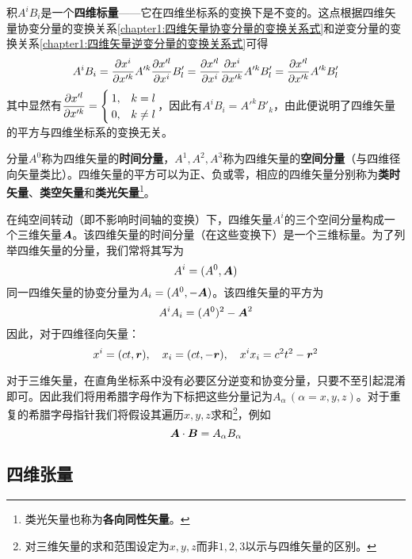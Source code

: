 积$A^iB_i$是一个{\bf 四维标量}——它在四维坐标系的变换下是不变的。这点根据四维矢量协变分量的变换关系\eqref{chapter1:四维矢量协变分量的变换关系式}和逆变分量的变换关系\eqref{chapter1:四维矢量逆变分量的变换关系式}可得
\begin{equation*}
	A^iB_i = \frac{\partial x^i}{\partial x'^k} A'^k \frac{\partial x'^l}{\partial x^i} B'_l = \frac{\partial x'^l}{\partial x^i} \frac{\partial x^i}{\partial x'^k} A'^k B'_l = \frac{\partial x'^l}{\partial x'^k} A'^kB'_l
\end{equation*}
其中显然有$\dfrac{\partial x'^l}{\partial x'^k} = \begin{cases} 1, & k=l \\ 0, & k\neq l \end{cases}$，因此有$A^iB_i = A'^kB'_k$，由此便说明了四维矢量的平方与四维坐标系的变换无关。

分量$A^0$称为四维矢量的{\bf 时间分量}，$A^1,A^2,A^3$称为四维矢量的{\bf 空间分量}（与四维径向矢量类比）。四维矢量的平方可以为正、负或零，相应的四维矢量分别称为{\bf 类时矢量}、{\bf 类空矢量}和{\bf 类光矢量}\footnote{类光矢量也称为{\bf 各向同性矢量}。}。

在纯空间转动（即不影响时间轴的变换）下，四维矢量$A^i$的三个空间分量构成一个三维矢量$\boldsymbol{A}$。该四维矢量的时间分量（在这些变换下）是一个三维标量。为了列举四维矢量的分量，我们常将其写为
\begin{equation*}
	A^i = (A^0,\boldsymbol{A})
\end{equation*}
同一四维矢量的协变分量为$A_i=(A^0,-\boldsymbol{A})$。该四维矢量的平方为
\begin{equation*}
	A^iA_i = (A^0)^2 - \boldsymbol{A}^2
\end{equation*}
因此，对于四维径向矢量：
\begin{equation*}
	x^i = (ct,\boldsymbol{r}),\quad x_i = (ct,-\boldsymbol{r}),\quad x^ix_i = c^2t^2- \boldsymbol{r}^2
\end{equation*}

对于三维矢量，在直角坐标系中没有必要区分逆变和协变分量，只要不至引起混淆即可。因此我们将用希腊字母作为下标把这些分量记为$A_\alpha\,(\alpha=x,y,z)$。对于重复的希腊字母指针我们将假设其遍历$x,y,z$求和\footnote{对三维矢量的求和范围设定为$x,y,z$而非$1,2,3$以示与四维矢量的区别。}，例如
\begin{equation*}
	\boldsymbol{A} \cdot \boldsymbol{B} = A_\alpha B_\alpha
\end{equation*}

\subsection{四维张量}

